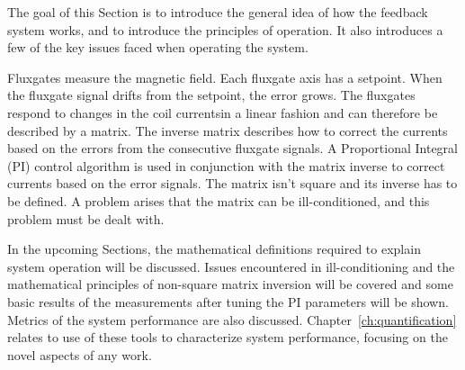 
The goal of this Section is to introduce the general idea of how the feedback system works, and to introduce the principles of operation.  It also introduces a few of the key issues faced when operating the system. 

Fluxgates measure the magnetic field. Each fluxgate axis has a setpoint. When the fluxgate signal drifts from the setpoint, the error grows. The fluxgates respond to changes in the coil currentsin a linear fashion and can therefore be described by a matrix. The inverse matrix describes how to correct the currents based on the errors from the consecutive fluxgate signals. A Proportional Integral (PI) control algorithm  is used in conjunction with the matrix inverse to correct currents based on the error signals. The matrix isn't square and its inverse has to be defined. A problem arises that the matrix can be ill-conditioned, and this problem must be dealt with. 

In the upcoming Sections, the mathematical definitions required to explain system operation will be discussed. Issues encountered in ill-conditioning and the mathematical principles of non-square matrix inversion will be covered and some basic results of the measurements after tuning the PI parameters will be shown. Metrics of the system performance are also discussed. Chapter~\ref{ch:quantification} relates to use of these tools to characterize system performance, focusing on the novel aspects of any work.

